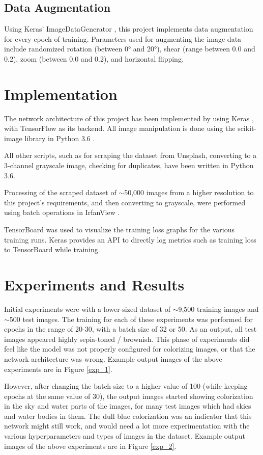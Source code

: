 \documentclass[10pt,twocolumn,letterpaper]{article}
\begin{document}
	\subsection{Data Augmentation}
	Using Keras' ImageDataGenerator \cite{Keras}, this project implements data augmentation for every epoch of training. Parameters used for augmenting the image data include randomized rotation (between 0° and 20°), shear (range between 0.0 and 0.2), zoom (between 0.0 and 0.2), and horizontal flipping.

	\section{Implementation}
	The network architecture of this project has been implemented by using Keras \cite{Keras}, with TensorFlow \cite{TensorFlow} as its backend. All image manipulation is done using the scikit-image \cite{scikit-image} library in Python 3.6 \cite{Python}.

	All other scripts, such as for scraping the dataset from Unsplash, converting to a 3-channel grayscale image, checking for duplicates, have been written in Python 3.6.

	Processing of the scraped dataset of $\sim$50,000 images from a higher resolution to this project's requirements, and then converting to grayscale, were performed using batch operations in IrfanView \cite{IrfanView}.

	TensorBoard \cite{TensorFlow} was used to visualize the training loss graphs for the various training runs. Keras provides an API to directly log metrics such as training loss to TensorBoard while training.

	\section{Experiments and Results}
	Initial experiments were with a lower-sized dataset of $\sim$9,500 training images and $\sim$500 test images. The training for each of these experiments was performed for epochs in the range of 20-30, with a batch size of 32 or 50. As an output, all test images appeared highly sepia-toned / brownish. This phase of experiments did feel like the model was not properly configured for colorizing images, or that the network architecture was wrong. Example output images of the above experiments are in Figure \ref{exp_1}.

	However, after changing the batch size to a higher value of 100 (while keeping epochs at the same value of 30), the output images started showing colorization in the sky and water parts of the images, for many test images which had skies and water bodies in them. The dull blue colorization was an indicator that this network might still work, and would need a lot more experimentation with the various hyperparameters and types of images in the dataset. Example output images of the above experiments are in Figure \ref{exp_2}.
\end{document}
